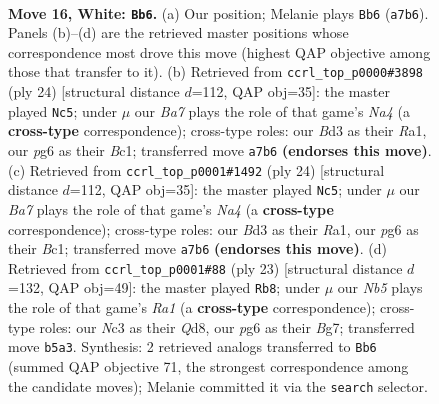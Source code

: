 \documentclass[11pt]{article}
\begin{document}
\clearpage

\begin{figure}[p]\centering
\begin{subfigure}{0.46\textwidth}\centering
\resizebox{\linewidth}{!}{%
\newchessgame
\chessboard[
  setfen={r3kb1r/Bp1bpp1n/3p2p1/qN5p/1n2P3/1PNB1P2/P1P2QPP/2K1R2R w kq - 1 16},
  showmover=false,
  pgfstyle=straightmove, color=movearrow, markmove={a7-b6}
]}
\caption{}
\end{subfigure}\hfill
\begin{subfigure}{0.46\textwidth}\centering
\resizebox{\linewidth}{!}{%
\newchessgame
\chessboard[
  setfen={r3kb1r/2qb1ppp/p1n1p3/1p1pPn2/N2P4/5N2/PP2BPPP/R1BQ1R1K w kq - 0 13},
  showmover=false,
  pgfstyle=straightmove, color=movearrow, markmove={a4-c5}
]}
\caption{}
\end{subfigure}
\\[4pt]
\begin{subfigure}{0.46\textwidth}\centering
\resizebox{\linewidth}{!}{%
\newchessgame
\chessboard[
  setfen={r3kb1r/2qb1ppp/p1n1p3/1p1pPn2/N2P4/5N2/PP2BPPP/R1BQ1R1K w kq - 0 13},
  showmover=false,
  pgfstyle=straightmove, color=movearrow, markmove={a4-c5}
]}
\caption{}
\end{subfigure}\hfill
\begin{subfigure}{0.46\textwidth}\centering
\resizebox{\linewidth}{!}{%
\newchessgame
\chessboard[
  setfen={r2q1rk1/pQ1b1pbp/4pnp1/3pN3/3n4/2N3P1/PP2PPBP/R1BR2K1 b - - 1 12},
  showmover=false,
  pgfstyle=straightmove, color=movearrow, markmove={a8-b8}
]}
\caption{}
\end{subfigure}
\caption{\textbf{Move 16, White: \texttt{Bb6}.} (a) Our position; Melanie plays \texttt{Bb6} (\texttt{a7b6}). Panels (b)--(d) are the retrieved master positions whose correspondence most drove this move (highest QAP objective among those that transfer to it). (b) Retrieved from \texttt{ccrl\_top\_p0000\#3898} (ply 24) [structural distance $d$=112, QAP obj=35]: the master played \texttt{Nc5}; under $\mu$ our \emph{Ba7} plays the role of that game's \emph{Na4} (a \textbf{cross-type} correspondence); cross-type roles: our \emph{B}d3 as their \emph{R}a1, our \emph{p}g6 as their \emph{B}c1; transferred move \texttt{a7b6} \textbf{(endorses this move)}. (c) Retrieved from \texttt{ccrl\_top\_p0001\#1492} (ply 24) [structural distance $d$=112, QAP obj=35]: the master played \texttt{Nc5}; under $\mu$ our \emph{Ba7} plays the role of that game's \emph{Na4} (a \textbf{cross-type} correspondence); cross-type roles: our \emph{B}d3 as their \emph{R}a1, our \emph{p}g6 as their \emph{B}c1; transferred move \texttt{a7b6} \textbf{(endorses this move)}. (d) Retrieved from \texttt{ccrl\_top\_p0001\#88} (ply 23) [structural distance $d$=132, QAP obj=49]: the master played \texttt{Rb8}; under $\mu$ our \emph{Nb5} plays the role of that game's \emph{Ra1} (a \textbf{cross-type} correspondence); cross-type roles: our \emph{N}c3 as their \emph{Q}d8, our \emph{p}g6 as their \emph{B}g7; transferred move \texttt{b5a3}. Synthesis: 2 retrieved analogs transferred to \texttt{Bb6} (summed QAP objective 71, the strongest correspondence among the candidate moves); Melanie committed it via the \texttt{search} selector.}
\label{fig:thought-m30}
\end{figure}
\end{document}
